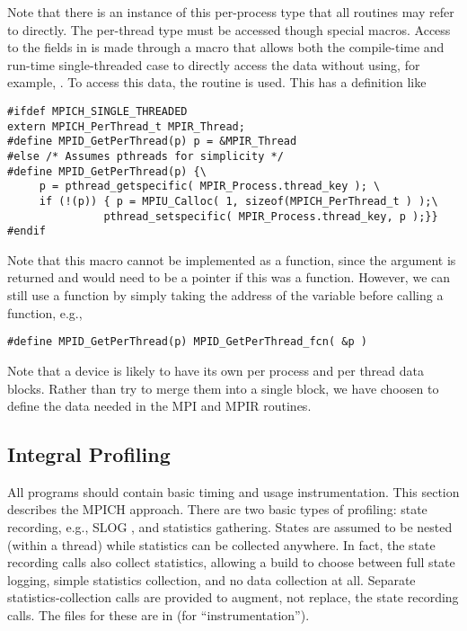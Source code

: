 \documentclass{article}
\begin{document}
Note that there is an instance of this per-process type that all routines may
refer to directly.  The per-thread type must be accessed though special
macros. 
Access to the fields in  is made through a macro that
allows both the compile-time and run-time single-threaded case to directly
access the data without using, for example, .
To access this data, the routine  is used.  This
has a definition like
\begin{verbatim}
#ifdef MPICH_SINGLE_THREADED
extern MPICH_PerThread_t MPIR_Thread;
#define MPID_GetPerThread(p) p = &MPIR_Thread
#else /* Assumes pthreads for simplicity */
#define MPID_GetPerThread(p) {\
     p = pthread_getspecific( MPIR_Process.thread_key ); \
     if (!(p)) { p = MPIU_Calloc( 1, sizeof(MPICH_PerThread_t ) );\
               pthread_setspecific( MPIR_Process.thread_key, p );}}
#endif
\end{verbatim}

Note that this macro cannot be implemented as a function,
since the argument is returned and would need to be a pointer if this
was a function.  However, we can still use a function by simply
taking the address of the variable before calling a function, e.g., 
\begin{verbatim}
#define MPID_GetPerThread(p) MPID_GetPerThread_fcn( &p )
\end{verbatim}

Note that a device is likely to have its own per process and per
thread data blocks.  Rather than try to merge them into a single
block, we have choosen to define the data needed in the MPI and MPIR
routines.

\subsection{Integral Profiling}
\label{sec:builtin-timing}
All programs should contain basic timing and usage instrumentation.  This
section describes the MPICH approach.
There are two basic types of profiling: state recording, e.g., SLOG
\cite{slog}, and 
statistics gathering.  States are assumed to be nested (within a
thread) while statistics can be collected anywhere.  In fact, the
state recording calls also collect statistics, allowing a build to
choose between full state logging, simple statistics collection, and
no data collection at all.  Separate statistics-collection calls are
provided to augment, not replace, the state recording calls.
The files for these are in \file{util/instrm} (for ``instrumentation'').
\end{document}
